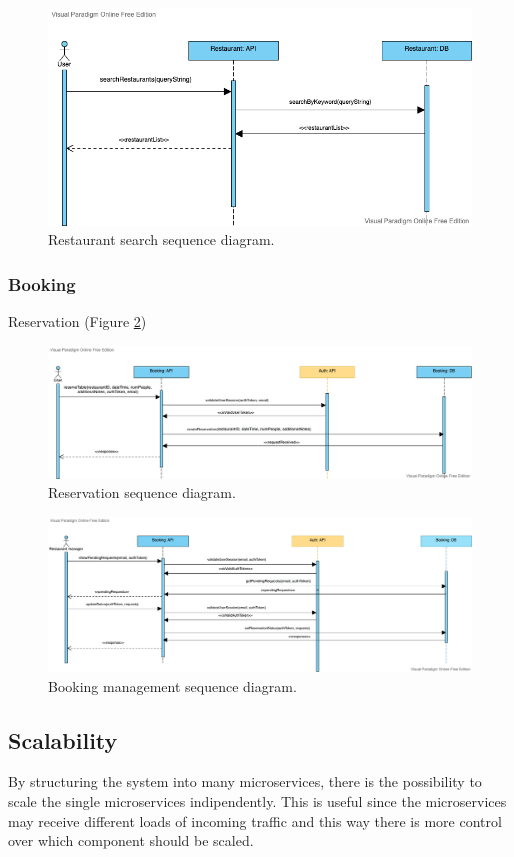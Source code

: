 \begin{figure}
    \includegraphics[width=\linewidth]{../docs/sequence/search/search.png}
    \caption{Restaurant search sequence diagram.}
    \label{fig:restaurant_search}
\end{figure}

\subsubsection{Booking}

Reservation (Figure \ref{fig:reserve})

\begin{figure}
    \includegraphics[width=\linewidth]{../docs/sequence/booking/reserve.png}
    \caption{Reservation sequence diagram.}
    \label{fig:reserve}
\end{figure}

\begin{figure}
    \includegraphics[width=\linewidth]{../docs/sequence/manageBooking/manageBooking.png}
    \caption{Booking management sequence diagram.}
    \label{fig:manage_booking}
\end{figure}

\subsection{Scalability}

By structuring the system into many microservices, there is the possibility
to scale the single microservices indipendently. This is useful since the
microservices may receive different loads of incoming traffic and this
way there is more control over which component should be scaled.